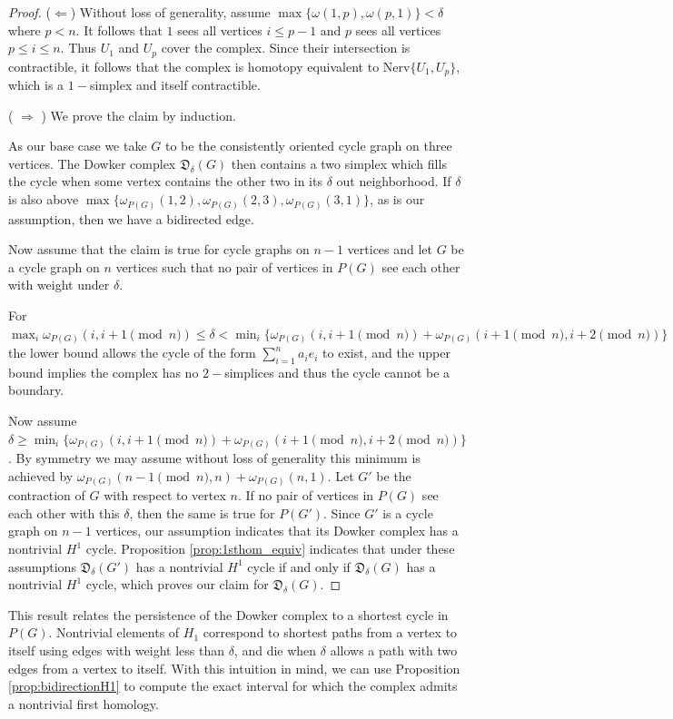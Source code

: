 \documentclass[pdflatex,bst/sn-mathphys-num]{sn-jnl}%
\theoremstyle{thmstyleone}%
\theoremstyle{definition}
\theoremstyle{thmstyletwo}%
\newcommand{\FD}{\mathfrak{D}}
\theoremstyle{thmstylethree}%
\begin{document}
\begin{proof}
    ($\Longleftarrow$)     
    Without loss of generality, assume $\max\{ \omega(1,p), \omega(p,1) \} < \delta$ where $p<n$.
    It follows that $1$ sees all vertices $i\leq p-1$ and $p$ sees all vertices $p\leq i\leq n$. Thus $U_1$ and $U_p$ cover the complex. Since their intersection is contractible, it follows that the complex is homotopy equivalent to Nerv$\{U_1, U_p\}$, which is a $1-$simplex and itself contractible.

    ( $\Longrightarrow$ )
    We prove the claim by induction.

    As our base case we take $G$ to be the consistently oriented cycle graph on three vertices. The Dowker complex $\FD_\delta(G)$ 
   then contains a two simplex which fills the cycle when some vertex contains the other two in its $\delta$ out neighborhood. If $\delta$ is also above $\max\{\omega_{P(G)}(1,2),\omega_{P(G)}(2,3),\omega_{P(G)}(3,1)\}$, as is our assumption, then we have a bidirected edge.

    Now assume that the claim is true for cycle graphs on $n-1$ vertices and let $G$ be a cycle graph on $n$ vertices such that no pair of vertices in $P(G)$ see each other with weight under $\delta$. 

    For $\max_i \omega_{P(G)}(i,i+1 \pmod{n})\leq \delta < \min_{i}\{\omega_{P(G)}(i,i+1\pmod{n})+\omega_{P(G)}(i+1\pmod{n},i+2\pmod{n})\}$ the lower bound allows the cycle of the form $\sum_{i=1}^n a_ie_i$ to exist, and the upper bound implies the complex has no $2-$simplices and thus the cycle cannot be a boundary.
    
    Now assume $\delta \geq \min_{i}\{\omega_{P(G)}(i,i+1\pmod{n})+\omega_{P(G)}(i+1\pmod{n},i+2\pmod{n})\}$. By symmetry we may assume without loss of generality this minimum is achieved by $\omega_{P(G)}(n-1\pmod{n},n)+\omega_{P(G)}(n,1)$. Let $G'$ be the contraction of $G$ with respect to vertex $n$. If no pair of vertices in $P(G)$ see each other with this $\delta$, then the same is true for $P(G')$. Since $G'$ is a cycle graph on $n-1$ vertices, our assumption indicates that its Dowker complex has a nontrivial $H^1$ cycle. Proposition \ref{prop:1sthom_equiv} indicates that under these assumptions $\FD_\delta(G')$ has a nontrivial $H^1$ cycle if and only if $\FD_\delta(G)$ has a nontrivial $H^1$ cycle, which proves our claim for $\FD_\delta(G)$.
\end{proof}

This result relates the persistence of the Dowker complex to a shortest cycle in $P(G)$. Nontrivial elements of $H_1$ correspond to shortest paths from a vertex to itself using edges with weight less than $\delta$, and die when $\delta$ allows a path with two edges from a vertex to itself. With this intuition in mind, we can use Proposition \ref{prop:bidirectionH1} to compute the exact interval for which the complex admits a nontrivial first homology.
\end{document}
